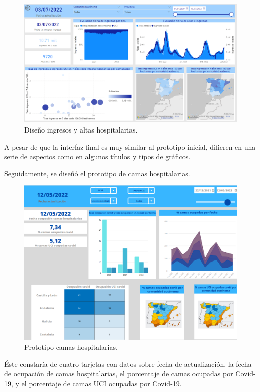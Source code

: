 \begin{figure}[h]
    \advance\leftskip-0.5cm 
    \includegraphics[scale=0.55]{img/powerBI_ingresosYaltas.PNG}
    \caption{Diseño ingresos y altas hospitalarias.}
\end{figure}

A pesar de que la interfaz final es muy similar al prototipo inicial, difieren en una serie de aspectos como en algunos títulos y tipos de gráficos.

\newpage
Seguidamente, se diseñó el prototipo de camas hospitalarias. 

\begin{figure}[h]
    \advance\leftskip-1cm 
    \includegraphics[scale=0.7]{img/prototipo_camas.PNG}
    \caption{Prototipo camas hospitalarias.}
\end{figure}

Éste constaría de cuatro tarjetas con datos sobre fecha de actualización, la fecha de ocupación de camas hospitalarias, el porcentaje de camas ocupadas por Covid-19, y el porcentaje de camas UCI ocupadas por Covid-19. 

